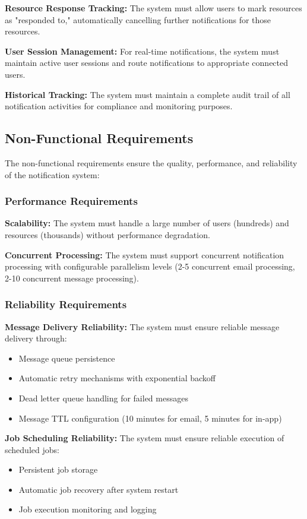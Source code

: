 \textbf{Resource Response Tracking:} The system must allow users to mark resources as "responded to," automatically cancelling further notifications for those resources.

\noindent
\textbf{User Session Management:} For real-time notifications, the system must maintain active user sessions and route notifications to appropriate connected users.

\noindent
\textbf{Historical Tracking:} The system must maintain a complete audit trail of all notification activities for compliance and monitoring purposes.

\subsection{Non-Functional Requirements}

The non-functional requirements ensure the quality, performance, and reliability of the notification system:

\subsubsection{Performance Requirements}

\textbf{Scalability:} The system must handle a large number of users (hundreds) and resources (thousands) without performance degradation.

\noindent
\textbf{Concurrent Processing:} The system must support concurrent notification processing with configurable parallelism levels (2-5 concurrent email processing, 2-10 concurrent message processing).

\subsubsection{Reliability Requirements}

\textbf{Message Delivery Reliability:} The system must ensure reliable message delivery through:
\begin{itemize}
    \item Message queue persistence
    \item Automatic retry mechanisms with exponential backoff
    \item Dead letter queue handling for failed messages
    \item Message TTL configuration (10 minutes for email, 5 minutes for in-app)
\end{itemize}

\noindent
\textbf{Job Scheduling Reliability:} The system must ensure reliable execution of scheduled jobs:
\begin{itemize}
    \item Persistent job storage
    \item Automatic job recovery after system restart
    \item Job execution monitoring and logging
\end{itemize}

